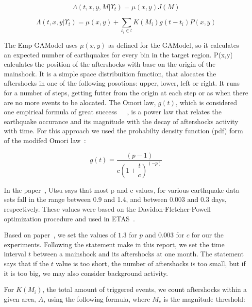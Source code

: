 \begin{equation}\label{reducedgamodel}
	\Lambda(t,x,y,M|\Upsilon_t) = \mu(x,y)J(M)
\end{equation}


\begin{equation}\label{emp-model}
 \Lambda(t,x,y|\Upsilon_t) = \mu(x,y) + \displaystyle\sum_{t_i \in t} K(M_i)g(t-t_i)P(x,y)
\end{equation}

The Emp-GAModel uses $\mu(x,y)$ as defined for the GAModel, so it
calculates an expected number of earthquakes for every bin in the
target region. P(x,y) calculates the position of the aftershocks with base on the origin of the mainshock. It is a simple space distribuition function, that alocates the aftershocks in one of the following posotions: upper, lower, left or right. It runs for a number of steps, getting futter from the origin at each step or as when there are no more events to be alocated. The Omori law, $g(t)$, which is considered one
empirical formula of great
success~\cite{zhuang2004analyzing}~\cite{utsu1995centenary}~\cite{omori1895after},
is a power law that relates the earthquake occurance and its magnitude
with the decay of aftershocks activity with time. For this approach we
used the probabilty density function (pdf) form of the modifed Omori
law~\cite{zhuang2004analyzing}:

\begin{equation}\label{omori}
	g(t)= \dfrac{(p-1)}{c(1+ \dfrac{t}{c})^(-p)}
\end{equation}

In the paper~\cite{utsu1995centenary}, Utsu says that most p and c
values, for various earthquake data sets fall in the range between 0.9
and 1.4, and between 0.003 and 0.3 days, respectively. These values
were based on the Davidon-Fletcher-Powell optimization procedure and
used in ETAS~\cite{utsu1995centenary}.

Based on paper~\cite{yamanaka1990scaling}, we set the values of $1.3$
for $p$ and $0.003$ for $c$ for our the experiments. Following the
statement make in this report, we set the time interval $t$ between a
mainshock and its aftershocks at one month. The statement says that if
the $t$ value is too short, the number of aftershocks is too small,
but if it is too big, we may also consider background activity.

For $K(M_i)$, the total amount of triggered events, we count
aftershocks within a given area, $A$, using the following formula,
where $M_c$ is the magnitude threshold:

